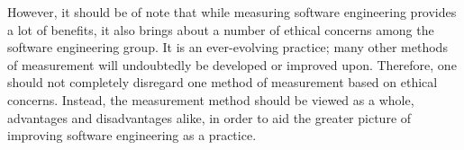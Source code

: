 \documentclass{article}
\begin{document}
However, it should be of note that while measuring software engineering
provides a lot of benefits, it also brings about a number of ethical concerns
among the software engineering group. It is an ever-evolving practice; many
other methods of measurement will undoubtedly be developed or improved upon.
Therefore, one should not completely disregard one method of measurement based
on ethical concerns. Instead, the measurement method should be viewed as a
whole, advantages and disadvantages alike, in order to aid the greater picture
of improving software engineering as a practice.

\newpage



\end{document}
